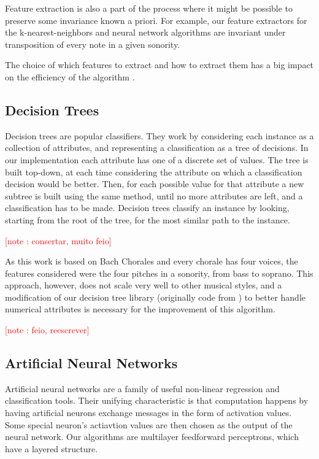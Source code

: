 \documentclass{article}
\newcounter{notecounter}
\newcommand{\note}[1]{
  \addtocounter{notecounter}{1}
  \textcolor{red}{[note \arabic{notecounter}: #1]}
}
\begin{document}
Feature extraction is also a part of the process where it might be
possible to preserve some invariance known a priori. For example, our
feature extractors for the k-nearest-neighbors and neural network
algorithms are invariant under transposition of every note in a given
sonority.

The choice of which features to extract and how to extract them has a
big impact on the efficiency of the algorithm \cite{mitchell:machine}.

\subsection{Decision Trees}
\label{sec:tree}

Decision trees are popular classifiers. They work by considering each
instance as a collection of attributes, and representing a
classification as a tree of decisions. In our implementation each
attribute has one of a discrete set of values. The tree is built
top-down, at each time considering the attribute on which a
classification decision would be better. Then, for each possible value
for that attribute a new subtree is built using the same method, until
no more attributes are left, and a classification has to be
made. Decision trees classify an instance by looking, starting from
the root of the tree, for the most similar path to the
instance. \note{consertar, muito feio}

As this work is based on Bach Chorales and every chorale has four
voices, the features considered were the four pitches in a sonority,
from bass to soprano. This approach, however, does not scale very well
to other musical styles, and a modification of our decision tree
library (originally code from \cite{mitchell:machine}) to better
handle numerical attributes is necessary for the improvement of this
algorithm. \note{feio, reescrever}

\subsection{Artificial Neural Networks}
\label{sec:neural-net}

Artificial neural networks are a family of useful non-linear
regression and classification tools. Their unifying characteristic is
that computation happens by having artificial neurons exchange
messages in the form of activation values. Some special neuron's
actiavtion values are then chosen as the output of the neural
network. Our algorithms are multilayer feedforward perceptrons, which
have a layered structure.
\end{document}
